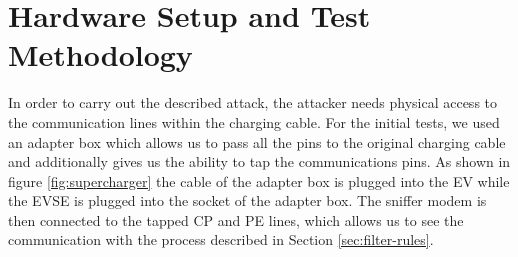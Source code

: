 \documentclass[sigconf]{acmart}
\begin{document}

\section{Hardware Setup and Test Methodology}
In order to carry out the described attack, the attacker needs physical access to the communication lines within the charging cable.
For the initial tests, we used an adapter box which allows us to pass all the pins to the original charging cable and additionally gives us the ability to tap the communications pins. As shown in figure \ref{fig:supercharger} the cable of the adapter box is plugged into the EV while the EVSE is plugged into the socket of the adapter box. The sniffer modem is then connected to the tapped CP and PE lines, which allows us to see the communication with the process described in Section \ref{sec:filter-rules}.
\end{document}
